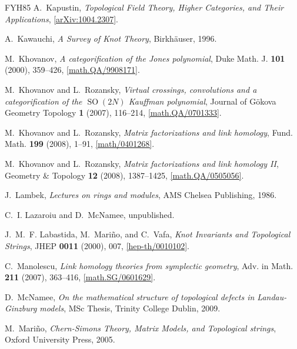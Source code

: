 \documentclass{compositio}
\theoremstyle{definition}
\numberwithin{equation}{section}
\begin{document}
\begin{thebibliography}{FYH{\etalchar{+}}85}
A.~Kapustin, \emph{Topological {F}ield {T}heory, {H}igher {C}ategories, and
  {T}heir {A}pplications},
  \href{http://arxiv.org/abs/1004.2307}{[arXiv:1004.2307]}.

A.~Kawauchi, \emph{A {S}urvey of {K}not {T}heory}, Birkh\"auser, 1996.

M.~Khovanov, \emph{A categorification of the {J}ones polynomial}, Duke Math. J.
  \textbf{101} (2000), 359--426,
  \href{http://arxiv.org/abs/math/9908171}{[math.QA/9908171]}.

M.~Khovanov and L.~Rozansky, \emph{Virtual crossings, convolutions and a
  categorification of the {$\operatorname{SO}(2N)$} {K}auffman polynomial},
  Journal of G\"okova Geometry Topology \textbf{1} (2007), 116--214,
  \href{http://arxiv.org/abs/math/0701333}{[math.QA/0701333]}.

M.~Khovanov and L.~Rozansky, \emph{Matrix factorizations and link homology}, Fund. Math.
  \textbf{199} (2008), 1--91,
  \href{http://arxiv.org/abs/math/0401268}{[math/0401268]}.

M.~Khovanov and L.~Rozansky, \emph{Matrix factorizations and link homology {II}}, Geometry \&
  Topology \textbf{12} (2008), 1387--1425,
  \href{http://arxiv.org/abs/math/0505056}{[math.QA/0505056]}.

J.~Lambek, \emph{Lectures on rings and modules}, AMS Chelsea Publishing, 1986.

C.~I. Lazaroiu and D.~McNamee, unpublished.

J.~M.~F. Labastida, M.~Mari\~{n}o, and C.~Vafa, \emph{Knot {I}nvariants and
  {T}opological {S}trings}, JHEP \textbf{0011} (2000), 007,
  \href{http://arxiv.org/abs/hep-th/0010102}{[hep-th/0010102]}.

C.~Manolescu, \emph{Link homology theories from symplectic geometry}, Adv. in
  Math. \textbf{211} (2007), 363--416,
  \href{http://www.arxiv.org/abs/math.AG/0601629}{[math.SG/0601629]}.

D.~McNamee, \emph{On the mathematical structure of topological defects in
  {L}andau-{G}inzburg models}, MSc Thesis, Trinity College Dublin, 2009.

M.~Mari\~{n}o, \emph{Chern-{S}imons {T}heory, {M}atrix {M}odels, and
  {T}opological s{t}rings}, Oxford University Press, 2005.


\end{thebibliography}
\end{document}
